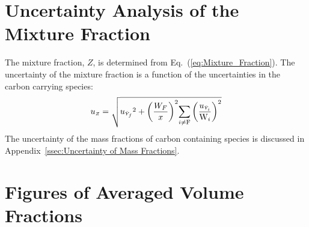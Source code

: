 \documentclass[12pt]{article}
\begin{document}



\pagebreak

\section{Uncertainty Analysis of the Mixture Fraction}\label{sec:Uncertainty_Mix_Frac}

The mixture fraction, $Z$, is determined from Eq.~(\ref{eq:Mixture_Fraction}). The uncertainty of the mixture fraction is a function of the uncertainties in the carbon carrying species:
\begin{equation}
\label{eq:mixture_frac_uncertainty}
u_{\scriptscriptstyle Z}=\sqrt{{u_{\scriptscriptstyle \bar{Y}_{f}}}^2+{\left(\frac{W_F}{x}\right)}^2{\sum_{i\ne {\rm F}}{\left(\frac{u_{\scriptscriptstyle \bar{Y}_{i}}}{\textrm{W}_{i}} \right)}^2}}
\end{equation}
The uncertainty of the mass fractions of carbon containing species is discussed in Appendix~\ref{ssec:Uncertainty of Mass Fractions}.


\pagebreak

\section{Figures of Averaged Volume Fractions}\label{sec:Vol_Frac_Figs}
\end{document}
